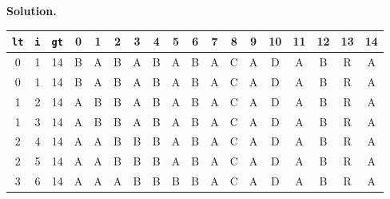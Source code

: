 \documentclass[12pt, a4paper]{article}
\newenvironment{sol}[1][Solution]
{\par\medskip\noindent \textbf{#1.} }
{\medskip}
\begin{document}
	\begin{sol}
		\begin{center}
			\begin{tabular}{ccc|ccccccccccccccc}
				\texttt{lt} & \texttt{i} & \texttt{gt} &
				0 & 1 & 2 & 3 & 4 & 5 & 6 & 7 & 8 & 9 & 10 & 11 & 12 & 13 & 14\\
				\hline
				
				0 & 1 & 14 &
				{\color{red}B} & A & B & A & B & A & B & A & C & A & D & A & B & R & A \\
				
				0 & 1 & 14 &
				{\color{black}B} & {\color{red}A} & {\color{gray}B} & {\color{gray}A} & {\color{gray}B} & {\color{gray}A} & {\color{gray}B} & {\color{gray}A} & {\color{gray}C} & {\color{gray}A} & {\color{gray}D} & {\color{gray}A} & {\color{gray}B} & {\color{gray}R} & {\color{black}A} \\
				
				1 & 2 & 14 &
				{\color{gray}A} & {\color{black}B} & {\color{red}B} & {\color{gray}A} & {\color{gray}B} & {\color{gray}A} & {\color{gray}B} & {\color{gray}A} & {\color{gray}C} & {\color{gray}A} & {\color{gray}D} & {\color{gray}A} & {\color{gray}B} & {\color{gray}R} & {\color{black}A} \\
				
				1 & 3 & 14 &
				{\color{gray}A} & {\color{black}B} & {\color{gray}B} & {\color{red}A} & {\color{gray}B} & {\color{gray}A} & {\color{gray}B} & {\color{gray}A} & {\color{gray}C} & {\color{gray}A} & {\color{gray}D} & {\color{gray}A} & {\color{gray}B} & {\color{gray}R} & {\color{black}A} \\
				
				2 & 4 & 14 &
				{\color{gray}A} & {\color{gray}A} & {\color{black}B} & {\color{gray}B} & {\color{red}B} & {\color{gray}A} & {\color{gray}B} & {\color{gray}A} & {\color{gray}C} & {\color{gray}A} & {\color{gray}D} & {\color{gray}A} & {\color{gray}B} & {\color{gray}R} & {\color{black}A} \\
				
				2 & 5 & 14 &
				{\color{gray}A} & {\color{gray}A} & {\color{black}B} & {\color{gray}B} & {\color{gray}B} & {\color{red}A} & {\color{gray}B} & {\color{gray}A} & {\color{gray}C} & {\color{gray}A} & {\color{gray}D} & {\color{gray}A} & {\color{gray}B} & {\color{gray}R} & {\color{black}A} \\
				
				3 & 6 & 14 &
				{\color{gray}A} & {\color{gray}A} & {\color{gray}A} & {\color{black}B} & {\color{gray}B} & {\color{gray}B} & {\color{red}B} & {\color{gray}A} & {\color{gray}C} & {\color{gray}A} & {\color{gray}D} & {\color{gray}A} & {\color{gray}B} & {\color{gray}R} & {\color{black}A} \\
				

\end{tabular}
\end{center}
\end{sol}
\end{document}
